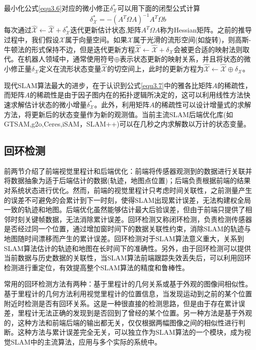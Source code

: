 最小化公式\eqref{equ3.6}对应的微小修正$\delta_\mathcal{X}^* $可以用下面的闭型公式计算
\begin{equation}
\label{equ3.7}
\delta_\mathcal{X}^* = - \left( A^T \Omega A \right)^{-1} A^T \Omega b
\end{equation}
每次通过$\hat{\mathcal{X}} \leftarrow \hat{\mathcal{X}}+\delta_\mathcal{X}^*$迭代更新估计状态,矩阵$A^T \Omega A$称为Hessian矩阵。之前的推导过程中，我们假设$\mathcal{X}$属于向量空间。如果$\mathcal{X}$属于光滑的流形空间(如旋转)，则高斯-牛顿法的形式保持不边，但是迭代更新方程$\hat{\mathcal{X}} \leftarrow \hat{\mathcal{X}}+\delta_\mathcal{X}$会被更合适的映射法则\upcite{[3.5]}取代。在机器人领域中，通常使用符号$\oplus$表示状态更新的映射关系，并且将状态的微小修正量$\delta_\mathcal{X}$定义在流形状态变量$\hat{\mathcal{X}}$的切空间上，此时的更新方程为$\hat{\mathcal{X}}  \leftarrow \hat{\mathcal{X}} \oplus \delta_\mathcal{X}$。

现代SLAM算法最大的进步，在于认识到公式\eqref{equ3.7}中的雅各比矩阵$A$的稀疏性，而矩阵$A$的稀疏性是由于因子图内在的拓扑逻辑所决定的\upcite{[]}，这可以利用线性方法快速求解估计状态的微小增量$\delta_\mathcal{X}^*$。此外，利用矩阵$A$的稀疏性可以设计增量式的求解方法，将更新后的状态变量作为新的观测值。当前主流SLAM后端优化库(如GTSAM,g2o,Ceres,iSAM，SLAM++)可以在几秒之内求解数以万计的状态变量。


\subsection{回环检测}
前两节介绍了前端视觉里程计和后端优化：前端将传感器观测到的数据进行关联并将数据抽象为适于后端估计的数据(轨迹，地图点位置)；后端负责根据前端的结果对系统状态进行优化。然而，前端的视觉里程计只考虑时间关联性，之前测量产生的误差不可避免的会累计到下一时刻，使得SLAM出现累计误差，无法构建权全局一致的轨迹和地图。后端优化虽然能够估计最大后验误差，但由于前端只提供了相邻时刻关键帧数据，无法消除累计误差。回环检测又称闭环检测，负责检测传感器是否经过同一个位置，通过增加窗时间下的数据关联性约束，消除SLAM的轨迹与地图随时间漂移而产生的累计误差。回环检测对于SLAM算法意义重大，关系到SLAM算法估计的轨迹和地图在长时间下的准确性。另外，由于回环检测可以提供当前数据与历史数据的关联性，当SLAM算法前端跟踪失效丢失后，可以利用回环检测进行重定位，有效提高整个SLAM算法的精度和鲁棒性。

常用的回环检测方法有两种\upcite{[3.7]}：基于里程计的几何关系或基于外观的图像间相似性。基于里程计的几何方法利用视觉里程计的位置信息，当发现运动到之前的某个位置附近时检测是否有回环关系。这是一种很直接的检测思路，但是由于存在累计误差，里程计无法正确的发现到是否回到了曾经的某个位置。另一种方法是基于外观的，这种方法和前端后端的输出都无关，仅仅根据两幅图像之间的相似性进行判断。这种方法与累计误差完全无关，可以独立作为SLAM算法的一个模块，成为视觉SLAM中的主流算法，应用与多个实际的系统中。


